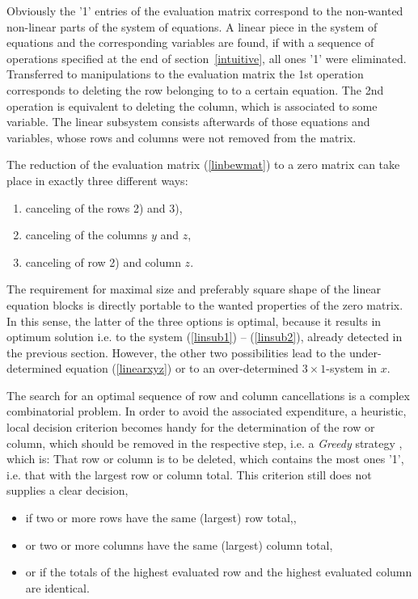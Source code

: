 Obviously the '1' entries of the evaluation matrix correspond to the non-wanted non-linear parts of the system of equations.  
A linear piece in the system of equations and the corresponding variables  are found, if with a sequence of  operations specified at the end of section~\ref{intuitive}, all ones '1' were eliminated. Transferred to manipulations to the evaluation matrix the 1st  operation corresponds to deleting the row belonging to to a certain equation. The 2nd operation is equivalent to deleting the column, which is associated to some variable. The linear subsystem consists afterwards of those equations and variables, whose rows and columns were not removed from the matrix.

The reduction of the evaluation matrix (\ref{linbewmat}) to a zero matrix can take place in exactly three different ways:
\begin{enumerate}
\item canceling of the rows 2) and 3),
\item canceling of the columns $y$ and $z$,
\item canceling of  row 2) and  column  $z$.
\end{enumerate}
The requirement for maximal size and preferably square shape of the linear equation blocks  is directly portable to the wanted properties of the zero matrix. In this sense, the latter of the three options is optimal, because it results in optimum solution i.e. to the system (\ref{linsub1}) -- (\ref{linsub2}), already detected in the previous section. However, the other two  possibilities lead  to the under-determined equation  (\ref{linearxyz})  or to an over-determined $3 \times 1$-system in $x$.

The search for an optimal sequence of row and column cancellations is a complex combinatorial problem. In order to avoid the associated expenditure, a heuristic, local decision criterion becomes handy for the determination of the row or column, which should be removed in the respective step, i.e. a  {\em Greedy} strategy
\cite{Foulds}, which is: That row or column is to be deleted, which contains the most ones '1', i.e. that with the largest row or column total. This criterion still does not supplies a clear decision,
\begin{itemize}
\item  if two or more rows have the same (largest) row total,,
\item or two or more columns have the same (largest) column total,
\item 
or if the totals of the highest evaluated row and the highest evaluated column are identical.
\end{itemize}

